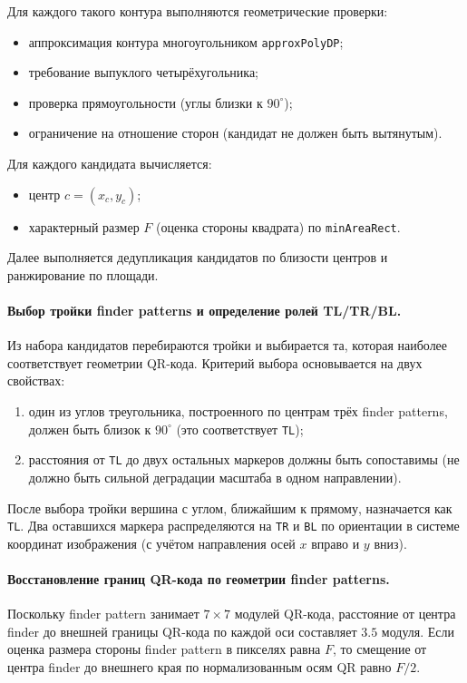 Для каждого такого контура выполняются геометрические проверки:
\begin{itemize}
	\item аппроксимация контура многоугольником \texttt{approxPolyDP};
	\item требование выпуклого четырёхугольника;
	\item проверка прямоугольности (углы близки к $90^\circ$);
	\item ограничение на отношение сторон (кандидат не должен быть вытянутым).
\end{itemize}

Для каждого кандидата вычисляется:
\begin{itemize}
	\item центр $c=(x_c,y_c)$;
	\item характерный размер $F$ (оценка стороны квадрата) по \texttt{minAreaRect}.
\end{itemize}

Далее выполняется дедупликация кандидатов по близости центров и ранжирование по площади.

\paragraph{Выбор тройки finder patterns и определение ролей TL/TR/BL.}
Из набора кандидатов перебираются тройки и выбирается та, которая наиболее соответствует геометрии QR-кода.
Критерий выбора основывается на двух свойствах:
\begin{enumerate}
	\item один из углов треугольника, построенного по центрам трёх finder patterns, должен быть близок к $90^\circ$ (это соответствует \texttt{TL});
	\item расстояния от \texttt{TL} до двух остальных маркеров должны быть сопоставимы (не должно быть сильной деградации масштаба в одном направлении).
\end{enumerate}

После выбора тройки вершина с углом, ближайшим к прямому, назначается как \texttt{TL}.
Два оставшихся маркера распределяются на \texttt{TR} и \texttt{BL} по ориентации в системе координат изображения (с учётом направления осей $x$ вправо и $y$ вниз).

\paragraph{Восстановление границ QR-кода по геометрии finder patterns.}
Поскольку finder pattern занимает $7\times7$ модулей QR-кода, расстояние от центра finder до внешней границы QR-кода по каждой оси составляет $3.5$ модуля.
Если оценка размера стороны finder pattern в пикселях равна $F$, то смещение от центра finder до внешнего края по нормализованным осям QR равно $F/2$.

